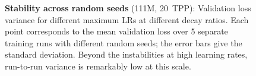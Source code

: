 \begin{figure}
  \centering
  \mbox{}
  \vspace{-1mm}
  \mbox{}
  \caption{\textbf{Stability across random seeds} (111M, 20~TPP):
    Validation loss variance for different maximum LRs at different
    decay ratios.  Each point corresponds to the mean validation loss
    over 5 separate training runs with different random seeds; the
    error bars give the standard deviation.  Beyond the instabilities
    at high learning rates, run-to-run variance is remarkably low at
    this scale.\label{fig:seeds}}
\end{figure}
